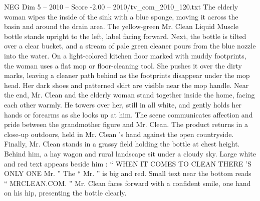 \begin{textsample}{NEG Dim 5 – 2010 – Score -2.00 – 2010/tv\_com\_2010\_120.txt}
The elderly woman wipes the inside of the sink with a blue sponge, moving it across the basin and around the drain area.
The yellow-green Mr.
Clean Liquid Muscle bottle stands upright to the left, label facing forward.
Next, the bottle is tilted over a clear bucket, and a stream of pale green cleaner pours from the blue nozzle into the water.
On a light-colored kitchen floor marked with muddy footprints, the woman uses a flat mop or floor-cleaning tool.
She pushes it over the dirty marks, leaving a cleaner path behind as the footprints disappear under the mop head.
Her dark shoes and patterned skirt are visible near the mop handle.
Near the end, Mr.
Clean and the elderly woman stand together inside the home, facing each other warmly.
He towers over her, still in all white, and gently holds her hands or forearms as she looks up at him.
The scene communicates affection and pride between the grandmother figure and Mr.
Clean.
The product returns in a close-up outdoors, held in Mr.
Clean ’s hand against the open countryside.
Finally, Mr.
Clean stands in a grassy field holding the bottle at chest height.
Behind him, a hay wagon and rural landscape sit under a cloudy sky.
Large white and red text appears beside him : “ WHEN IT COMES TO CLEAN THERE ’S ONLY ONE Mr. ” The “ Mr. ” is big and red.
Small text near the bottom reads “ MRCLEAN.COM. ” Mr.
Clean faces forward with a confident smile, one hand on his hip, presenting the bottle clearly.

\end{textsample}

